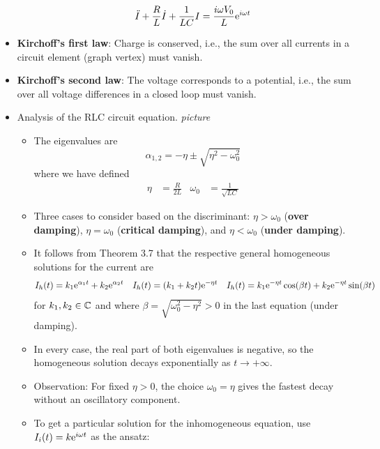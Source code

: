 \documentclass[../notes.tex]{subfiles}
\begin{document}
\begin{itemize}
\begin{itemize}
\begin{equation*}
            \ddot{I}+\frac{R}{L}\dot{I}+\frac{1}{LC}I = \frac{i\omega V_0}{L}\e[i\omega t]
        \end{equation*}
    \end{itemize}
    \item \textbf{Kirchoff's first law}: Charge is conserved, i.e., the sum over all currents in a circuit element (graph vertex) must vanish.
    \item \textbf{Kirchoff's second law}: The voltage corresponds to a potential, i.e., the sum over all voltage differences in a closed loop must vanish.
    \item Analysis of the RLC circuit equation.
    \emph{picture}
    \begin{itemize}
        \item The eigenvalues are
        \begin{equation*}
            \alpha_{1,2} = -\eta\pm\sqrt{\eta^2-\omega_0^2}
        \end{equation*}
        where we have defined
        \begin{align*}
            \eta &= \frac{R}{2L}&
            \omega_0 &= \frac{1}{\sqrt{LC}}
        \end{align*}
        \item Three cases to consider based on the discriminant: $\eta>\omega_0$ (\textbf{over damping}), $\eta=\omega_0$ (\textbf{critical damping}), and $\eta<\omega_0$ (\textbf{under damping}).
        \item It follows from Theorem 3.7 that the respective general homogeneous solutions for the current are
        \begin{align*}
            I_h(t) &= k_1\e[\alpha_1t]+k_2\e[\alpha_2t]&
            I_h(t) &= (k_1+k_2t)\e[-\eta t]&
            I_h(t) &= k_1\e[-\eta t]\cos(\beta t)+k_2\e[-\eta t]\sin(\beta t)
        \end{align*}
        for $k_1,k_2\in\C$ and where $\beta=\sqrt{\omega_0^2-\eta^2}>0$ in the last equation (under damping).
        \item In every case, the real part of both eigenvalues is negative, so the homogeneous solution decays exponentially as $t\to +\infty$.
        \item Observation: For fixed $\eta>0$, the choice $\omega_0=\eta$ gives the fastest decay without an oscillatory component.
        \item To get a particular solution for the inhomogeneous equation, use $I_i(t)=k\e[i\omega t]$ as the ansatz:
        \begin{align*}

\end{align*}
\end{itemize}
\end{itemize}
\end{document}
